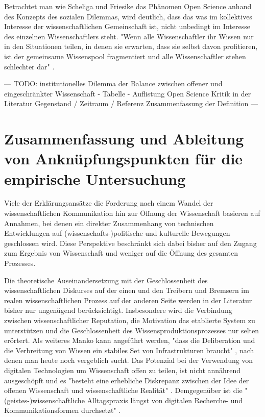 Betrachtet man wie Scheliga und Friesike das Phänomen Open Science anhand des Konzepts des sozialen Dilemmas, wird deutlich, dass das was im kollektives Interesse der wissenschaftlichen Gemeinschaft ist, nicht unbedingt im Interesse des einzelnen Wissenschaftlers steht. "Wenn alle Wissenschaftler ihr Wissen nur in den Situationen teilen, in denen sie erwarten, dass sie selbst davon profitieren, ist der gemeinsame Wissenspool fragmentiert und alle Wissenschaftler stehen schlechter dar" \cite{Scheliga_2014}.

--- TODO: institutionelles Dilemma der Balance zwischen offener und eingeschränkter Wissenschaft - Tabelle - Auflistung Open Science Kritik in der Literatur Gegenstand / Zeitraum / Referenz Zusammenfassung der Definition ---

\section{Zusammenfassung und Ableitung von Anknüpfungspunkten für die empirische Untersuchung}
Viele der Erklärungsansätze die Forderung nach einem Wandel der wissenschaftlichen Kommunikation hin zur Öffnung der Wissenschaft basieren auf Annahmen, bei denen ein direkter Zusammenhang von technischen Entwicklungen auf (wissenschafts-)politische und kulturelle Bewegungen geschlossen wird. Diese Perspektive beschränkt sich dabei bisher auf den Zugang zum Ergebnis von Wissenschaft und weniger auf die Öffnung des gesamten Prozesses.

Die theoretische Auseinandersetzung mit der Geschlossenheit des wissenschaftlichen Diskurses auf der einen und den Treibern und Bremsern im realen wissenschaftlichen Prozess auf der anderen Seite werden in der Literatur bisher nur ungenügend berücksichtigt. Insbesondere wird die Verbindung zwischen wissenschaftlicher Reputation, die Motivation das etablierte System zu unterstützen und die Geschlossenheit des Wissensproduktionsprozesses nur selten erörtert. Als weiteres Manko kann angeführt werden, "dass die Deliberation und die Verbreitung von Wissen ein stabiles Set von Infrastrukturen braucht" \cite{kelty_2004}, nach denen man heute noch vergeblich sucht. Das Potenzial bei der Verwendung von digitalen Technologien um Wissenschaft offen zu teilen, ist nicht annährend ausgeschöpft und es "besteht eine erhebliche Diskrepanz zwischen der Idee der offenen Wissenschaft und wissenschaftliche Realität" \cite{Scheliga_2014}. Demgegenüber ist die "(geistes-)wissenschaftliche Alltagspraxis längst von digitalen Recherche- und Kommunikationsformen durchsetzt" \cite{hagner_2015_sache_buches}.

